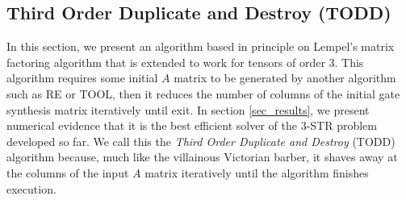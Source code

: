 \documentclass[notitlepage]{article}
\theoremstyle{definition}
\theoremstyle{problem}
\theoremstyle{lemma}
\begin{document}
\subsection{Third Order Duplicate and Destroy (TODD)}
\label{sec_TODD}
In this section, we present an algorithm based in principle on Lempel's matrix factoring algorithm \cite{8_Lempel_1975} that is extended to work for tensors of order 3. This algorithm requires some initial $A$ matrix to be generated by another algorithm such as RE or TOOL, then it reduces the number of columns of the initial gate synthesis matrix iteratively until exit. In section \ref{sec_results}, we present numerical evidence that it is the best efficient solver of the 3-STR problem developed so far.
We call this the \emph{Third Order Duplicate and Destroy} (TODD) algorithm because, much like the villainous Victorian barber, it shaves away at the columns of the input $A$ matrix iteratively until the algorithm finishes execution.

\end{document}
